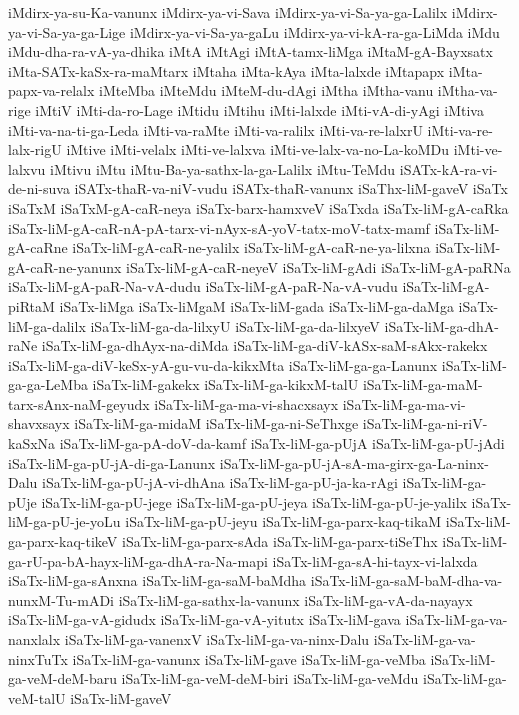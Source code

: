 {iMdirx-ya-su-Ka-vanunx
iMdirx-ya-vi-Sava
iMdirx-ya-vi-Sa-ya-ga-Lalilx
iMdirx-ya-vi-Sa-ya-ga-Lige
iMdirx-ya-vi-Sa-ya-gaLu
iMdirx-ya-vi-kA-ra-ga-LiMda
iMdu
iMdu-dha-ra-vA-ya-dhika
iMtA
iMtAgi
iMtA-tamx-liMga
iMtaM-gA-Bayxsatx
iMta-SATx-kaSx-ra-maMtarx
iMtaha
iMta-kAya
iMta-lalxde
iMtapapx
iMta-papx-va-relalx
iMteMba
iMteMdu
iMteM-du-dAgi
iMtha
iMtha-vanu
iMtha-va-rige
iMtiV
iMti-da-ro-Lage
iMtidu
iMtihu
iMti-lalxde
iMti-vA-di-yAgi
iMtiva
iMti-va-na-ti-ga-Leda
iMti-va-raMte
iMti-va-ralilx
iMti-va-re-lalxrU
iMti-va-re-lalx-rigU
iMtive
iMti-velalx
iMti-ve-lalxva
iMti-ve-lalx-va-no-La-koMDu
iMti-ve-lalxvu
iMtivu
iMtu
iMtu-Ba-ya-sathx-la-ga-Lalilx
iMtu-TeMdu
iSATx-kA-ra-vi-de-ni-suva
iSATx-thaR-va-niV-vudu
iSATx-thaR-vanunx
iSaThx-liM-gaveV
iSaTx
iSaTxM
iSaTxM-gA-caR-neya
iSaTx-barx-hamxveV
iSaTxda
iSaTx-liM-gA-caRka
iSaTx-liM-gA-caR-nA-pA-tarx-vi-nAyx-sA-yoV-tatx-moV-tatx-mamf
iSaTx-liM-gA-caRne
iSaTx-liM-gA-caR-ne-yalilx
iSaTx-liM-gA-caR-ne-ya-lilxna
iSaTx-liM-gA-caR-ne-yanunx
iSaTx-liM-gA-caR-neyeV
iSaTx-liM-gAdi
iSaTx-liM-gA-paRNa
iSaTx-liM-gA-paR-Na-vA-dudu
iSaTx-liM-gA-paR-Na-vA-vudu
iSaTx-liM-gA-piRtaM
iSaTx-liMga
iSaTx-liMgaM
iSaTx-liM-gada
iSaTx-liM-ga-daMga
iSaTx-liM-ga-dalilx
iSaTx-liM-ga-da-lilxyU
iSaTx-liM-ga-da-lilxyeV
iSaTx-liM-ga-dhA-raNe
iSaTx-liM-ga-dhAyx-na-diMda
iSaTx-liM-ga-diV-kASx-saM-sAkx-rakekx
iSaTx-liM-ga-diV-keSx-yA-gu-vu-da-kikxMta
iSaTx-liM-ga-ga-Lanunx
iSaTx-liM-ga-ga-LeMba
iSaTx-liM-gakekx
iSaTx-liM-ga-kikxM-talU
iSaTx-liM-ga-maM-tarx-sAnx-naM-geyudx
iSaTx-liM-ga-ma-vi-shacxsayx
iSaTx-liM-ga-ma-vi-shavxsayx
iSaTx-liM-ga-midaM
iSaTx-liM-ga-ni-SeThxge
iSaTx-liM-ga-ni-riV-kaSxNa
iSaTx-liM-ga-pA-doV-da-kamf
iSaTx-liM-ga-pUjA
iSaTx-liM-ga-pU-jAdi
iSaTx-liM-ga-pU-jA-di-ga-Lanunx
iSaTx-liM-ga-pU-jA-sA-ma-girx-ga-La-ninx-Dalu
iSaTx-liM-ga-pU-jA-vi-dhAna
iSaTx-liM-ga-pU-ja-ka-rAgi
iSaTx-liM-ga-pUje
iSaTx-liM-ga-pU-jege
iSaTx-liM-ga-pU-jeya
iSaTx-liM-ga-pU-je-yalilx
iSaTx-liM-ga-pU-je-yoLu
iSaTx-liM-ga-pU-jeyu
iSaTx-liM-ga-parx-kaq-tikaM
iSaTx-liM-ga-parx-kaq-tikeV
iSaTx-liM-ga-parx-sAda
iSaTx-liM-ga-parx-tiSeThx
iSaTx-liM-ga-rU-pa-bA-hayx-liM-ga-dhA-ra-Na-mapi
iSaTx-liM-ga-sA-hi-tayx-vi-lalxda
iSaTx-liM-ga-sAnxna
iSaTx-liM-ga-saM-baMdha
iSaTx-liM-ga-saM-baM-dha-va-nunxM-Tu-mADi
iSaTx-liM-ga-sathx-la-vanunx
iSaTx-liM-ga-vA-da-nayayx
iSaTx-liM-ga-vA-gidudx
iSaTx-liM-ga-vA-yitutx
iSaTx-liM-gava
iSaTx-liM-ga-va-nanxlalx
iSaTx-liM-ga-vanenxV
iSaTx-liM-ga-va-ninx-Dalu
iSaTx-liM-ga-va-ninxTuTx
iSaTx-liM-ga-vanunx
iSaTx-liM-gave
iSaTx-liM-ga-veMba
iSaTx-liM-ga-veM-deM-baru
iSaTx-liM-ga-veM-deM-biri
iSaTx-liM-ga-veMdu
iSaTx-liM-ga-veM-talU
iSaTx-liM-gaveV
}
